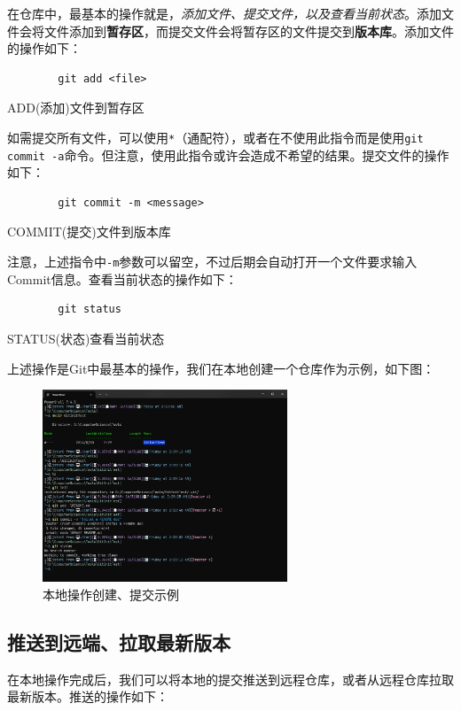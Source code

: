 在仓库中，最基本的操作就是，\textit{添加文件、提交文件，以及查看当前状态}。添加文件会将文件添加到\textbf{暂存区}，而提交文件会将暂存区的文件提交到\textbf{版本库}。添加文件的操作如下：

\begin{listing}[!htpb]
    \begin{verbatim}
        git add <file>
    \end{verbatim}
    \caption{ADD(添加)文件到暂存区}
\end{listing}

如需提交所有文件，可以使用\texttt{*}（通配符），或者在不使用此指令而是使用\texttt{git commit -a}命令。但注意，使用此指令或许会造成不希望的结果。提交文件的操作如下：

\begin{listing}[!htpb]
    \begin{verbatim}
        git commit -m <message>
    \end{verbatim}
    \caption{COMMIT(提交)文件到版本库}
\end{listing}

注意，上述指令中\texttt{-m}参数可以留空，不过后期会自动打开一个文件要求输入Commit信息。查看当前状态的操作如下：

\begin{listing}[!htpb]
    \begin{verbatim}
        git status
    \end{verbatim}
    \caption{STATUS(状态)查看当前状态}
\end{listing}

上述操作是Git中最基本的操作，我们在本地创建一个仓库作为示例，如下图：

\begin{figure}[!h]
    \centering
    \includegraphics[width=0.65\textwidth]{figures/git-local-operations.png}
    \caption{本地操作创建、提交示例}
    \label{fig:git-local-operations}
\end{figure}

\subsection{推送到远端、拉取最新版本}

在本地操作完成后，我们可以将本地的提交推送到远程仓库，或者从远程仓库拉取最新版本。推送的操作如下：